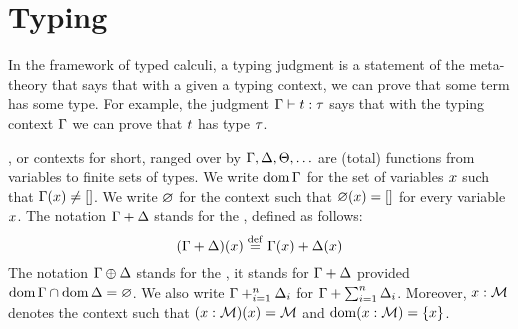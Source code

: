 \section{Typing}

In the framework of typed calculi, a typing judgment is a statement of the meta-theory that says that
with a given a typing context, we can prove that some term has some type.
For example, the judgment $\Gamma \vdash t : \tau$ says that with the typing context
$\Gamma$ we can prove that $t$ has type $\tau$.

, or contexts for short,
ranged over by $\Gamma,\Delta,\Theta,\hdots$ are (total) functions from variables to finite sets of types.
We write $\operatorname{dom}\Gamma$ for the set of variables $x$ such that $\Gamma(x) \neq []$.
We write $\varnothing$ for the context such that $\varnothing(x) = []$ for every variable $x$.
The notation $\Gamma + \Delta$ stands for the , defined as follows:
\[
    (\Gamma + \Delta)(x) \overset{\mathrm{def}}{=} \Gamma(x) + \Delta(x)
\]
The notation $\Gamma \oplus \Delta$ stands for the ,
\ie it stands for $\Gamma + \Delta$ provided $\operatorname{dom}\Gamma \cap \operatorname{dom}\Delta = \varnothing$.
We also write $\Gamma +_{i=1}^{n} \Delta_i$ for $\Gamma + \sum_{i=1}^{n} \Delta_i$.
Moreover, $x : \mathcal{M}$ denotes the context such that $(x : \mathcal{M})(x) = \mathcal{M}$
and $\operatorname{dom}(x : \mathcal{M}) = \{x\}$.

